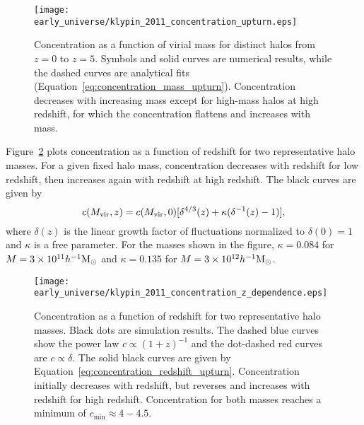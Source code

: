 \begin{figure}[tp]
	\centering
	\texttt{[image: early\_universe/klypin\_2011\_concentration\_upturn.eps]}
	\caption[Concentration upturn for high mass halos at high $z$]{\footnotesize Concentration as a function of virial mass for distinct halos from $z = 0$ to $z = 5$.  Symbols and solid curves are numerical results, while the dashed curves are analytical fits (Equation~\ref{eq:concentration_mass_upturn}).  Concentration decreases with increasing mass except for high-mass halos at high redshift, for which the concentration flattens and increases with mass.  \citep{2011ApJ...740..102K}}
	\label{fig:concentration--klypin_concentration_upturn}
\end{figure}

Figure~\ref{fig:concentration--klypin_concentration_z_dependence} plots concentration as a function of redshift for two representative halo masses.  For a given fixed halo mass, concentration decreases with redshift for low redshift, then increases again with redshift at high redshift.  The black curves are given by
\begin{equation} \label{eq:concentration_redshift_upturn}
	c({M_{\mathrm{vir}}}, z) = c({M_{\mathrm{vir}}}, 0) [\delta^{4/3}(z) + \kappa(\delta^{-1}(z) - 1)],
\end{equation}
where $\delta(z)$ is the linear growth factor of fluctuations normalized to $\delta(0) = 1$ and $\kappa$ is a free parameter.  For the masses shown in the figure, $\kappa = 0.084$ for $M = 3 \times 10^{11} h^{-1} {\rm M_\odot}$ and $\kappa = 0.135$ for $M = 3 \times 10^{12} h^{-1} {\rm M_\odot}$.

\begin{figure}[tp]
	\centering
	\texttt{[image: early\_universe/klypin\_2011\_concentration\_z\_dependence.eps]}
	\caption[Evolution of concentration with redshift for two halo masses]{\footnotesize Concentration as a function of redshift for two representative halo masses.  Black dots are simulation results.  The dashed blue curves show the power law $c \propto (1 + z)^{-1}$ and the dot-dashed red curves are $c \propto \delta$.  The solid black curves are given by Equation~\ref{eq:concentration_redshift_upturn}.  Concentration initially decreases with redshift, but reverses and increases with redshift for high redshift.  Concentration for both masses reaches a minimum of $c_{\min} \approx 4-4.5$. \citep{2011ApJ...740..102K}}
	\label{fig:concentration--klypin_concentration_z_dependence}
\end{figure}


